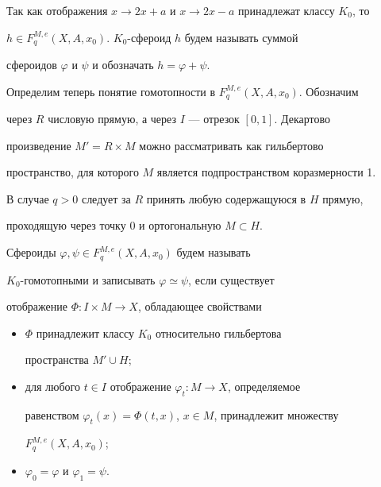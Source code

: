 Так как отображения $x\to2x+a$ и $x\to2x-a$ принадлежат классу $K_0$, то 


$h\in F^{M,e}_q(X,A,x_0)$. $K_0$-сфероид $h$ будем называть суммой 


сфероидов $\varphi$ и $\psi$ и обозначать $h=\varphi+\psi$. 


 


Определим теперь понятие гомотопности в $F^{M,e}_q(X,A,x_0)$. Обозначим 


через $R$ числовую прямую, а через $I$ --- отрезок $[0,1]$. Декартово 


произведение $M'=R\times M$ можно рассматривать как гильбертово 


пространство, для которого $M$ является подпространством коразмерности 1. 


В случае $q>0$ следует за $R$ принять любую содержащуюся в $H$ прямую, 


проходящую через точку 0 и ортогональную $M\subset H$. 


 


\begin{defn} 


Сфероиды $\varphi,\psi\in F^{M,e}_q(X,A,x_0)$ будем называть 


$K_0$-гомотопными и записывать $\varphi\simeq\psi$, если существует 


отображение $\Phi:I\times M\to X$, обладающее свойствами 


\begin{itemize} 


\item[1.] $\Phi$ принадлежит классу $K_0$ относительно гильбертова 


пространства $M'\cup H$; 


\item[2.] для любого $t\in I$ отображение $\varphi_t:M\to X$, определяемое 


равенством $\varphi_t(x)=\Phi(t,x)$, $x\in M$, принадлежит множеству 


$F^{M,e}_q(X,A,x_0)$; 


\item[3.] $\varphi_0=\varphi$ и $\varphi_1=\psi$. 


\end{itemize} 


\end{defn} 


 


